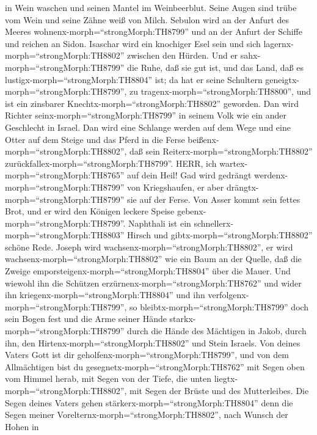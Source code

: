 in Wein waschen und seinen Mantel im Weinbeerblut.  Seine
Augen sind trübe vom Wein und seine Zähne weiß von Milch. 
Sebulon wird an der Anfurt des Meeres
wohnenx-morph=``strongMorph:TH8799'' und an der Anfurt der Schiffe und
reichen an Sidon.  Isaschar wird ein knochiger Esel sein
und sich lagernx-morph=``strongMorph:TH8802'' zwischen den Hürden.
 Und er sahx-morph=``strongMorph:TH8799'' die Ruhe, daß sie
gut ist, und das Land, daß es lustigx-morph=``strongMorph:TH8804'' ist;
da hat er seine Schultern geneigtx-morph=``strongMorph:TH8799'', zu
tragenx-morph=``strongMorph:TH8800'', und ist ein zinsbarer
Knechtx-morph=``strongMorph:TH8802'' geworden.  Dan wird
Richter seinx-morph=``strongMorph:TH8799'' in seinem Volk wie ein ander
Geschlecht in Israel.  Dan wird eine Schlange werden auf
dem Wege und eine Otter auf dem Steige und das Pferd in die Ferse
beißenx-morph=``strongMorph:TH8802'', daß sein
Reiterx-morph=``strongMorph:TH8802''
zurückfallex-morph=``strongMorph:TH8799''.  HERR, ich
wartex-morph=``strongMorph:TH8765'' auf dein Heil!  Gad
wird gedrängt werdenx-morph=``strongMorph:TH8799'' von Kriegshaufen, er
aber drängtx-morph=``strongMorph:TH8799'' sie auf der Ferse.
 Von Asser kommt sein fettes Brot, und er wird den Königen
leckere Speise gebenx-morph=``strongMorph:TH8799''. 
Naphthali ist ein schnellerx-morph=``strongMorph:TH8803'' Hirsch und
gibtx-morph=``strongMorph:TH8802'' schöne Rede.  Joseph
wird wachsenx-morph=``strongMorph:TH8802'', er wird
wachsenx-morph=``strongMorph:TH8802'' wie ein Baum an der Quelle, daß
die Zweige emporsteigenx-morph=``strongMorph:TH8804'' über die Mauer.
 Und wiewohl ihn die Schützen
erzürnenx-morph=``strongMorph:TH8762'' und wider ihn
kriegenx-morph=``strongMorph:TH8804'' und ihn
verfolgenx-morph=``strongMorph:TH8799'',  so
bleibtx-morph=``strongMorph:TH8799'' doch sein Bogen fest und die Arme
seiner Hände starkx-morph=``strongMorph:TH8799'' durch die Hände des
Mächtigen in Jakob, durch ihn, den Hirtenx-morph=``strongMorph:TH8802''
und Stein Israels.  Von deines Vaters Gott ist dir
geholfenx-morph=``strongMorph:TH8799'', und von dem Allmächtigen bist du
gesegnetx-morph=``strongMorph:TH8762'' mit Segen oben vom Himmel herab,
mit Segen von der Tiefe, die unten liegtx-morph=``strongMorph:TH8802'',
mit Segen der Brüste und des Mutterleibes.  Die Segen
deines Vaters gehen stärkerx-morph=``strongMorph:TH8804'' denn die Segen
meiner Vorelternx-morph=``strongMorph:TH8802'', nach Wunsch der Hohen in
